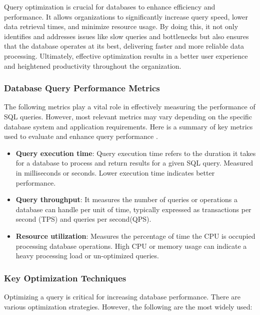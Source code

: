 Query optimization is crucial for databases to enhance efficiency and performance. It allows organizations to significantly increase query speed, lower data retrieval times, and minimize resource usage. By doing this, it not only identifies and addresses issues like slow queries and bottlenecks but also ensures that the database operates at its best, delivering faster and more reliable data processing. Ultimately, effective optimization results in a better user experience and heightened productivity throughout the organization\cite{team-2023, r-2024}.


\subsubsection{Database Query Performance Metrics}
The following metrics play a vital role in effectively measuring the performance of SQL queries. However, most relevant metrics may vary depending on the specific database system and application requirements.
Here is a summary of key metrics used to evaluate and enhance query performance \cite{chwesewicz-2024}.
\begin{itemize}
    \item\textbf{Query execution time}: Query execution time refers to the duration it takes for a database to process and return results for a given SQL query. Measured in milliseconds or seconds. Lower execution time indicates better performance.
    \item\textbf{Query throughput}: It measures the number of queries or operations a database can handle per unit of time, typically expressed as transactions per second (TPS) and queries per second(QPS).
    \item\textbf{Resource utilization}: Measures the percentage of time the CPU is occupied processing database operations. High CPU or memory usage can indicate a heavy processing load or un-optimized queries.
\end{itemize}

\subsubsection{Key Optimization Techniques}

Optimizing a query is critical for increasing database performance. There are various optimization strategies. However, the following are the most widely used:

